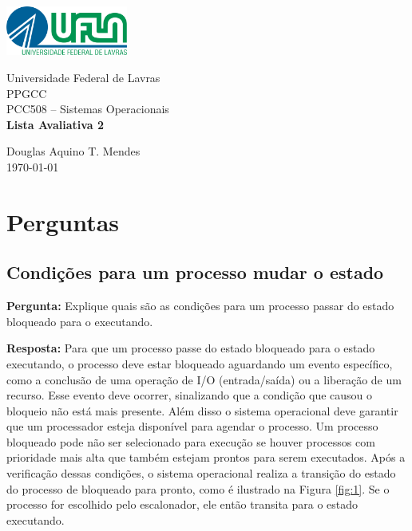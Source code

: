 \documentclass{article}
\begin{document}
\begin{titlepage}
    \centering
    \includegraphics[width=0.3\textwidth]{../Topic1/Avaliativo/Imagens/Logo UFLA - Colorida chapada.png}

    \vspace*{2cm} %
    \Large
    Universidade Federal de Lavras\\
    PPGCC\\
    PCC508 – Sistemas Operacionais\\
    
    \vspace{2cm} %
    \huge %
    \textbf{Lista Avaliativa 2}
    
    \vfill %
    
    \large
    Douglas Aquino T. Mendes\\
    \today %
\end{titlepage}

\tableofcontents
\newpage

\section{Perguntas}
\subsection{Condições para um processo mudar o estado}
\textbf{Pergunta:} Explique quais são as condições para um processo passar do estado bloqueado para o executando.\newline

\textbf{Resposta:} Para que um processo passe do estado bloqueado para o estado executando, o processo deve estar bloqueado aguardando um evento específico, como a conclusão de uma operação de I/O (entrada/saída) ou a liberação de um recurso. Esse evento deve ocorrer, sinalizando que a condição que causou o bloqueio não está mais presente. Além disso o sistema operacional deve garantir que um processador esteja disponível para agendar o processo. Um processo bloqueado pode não ser selecionado para execução se houver processos com prioridade mais alta que também estejam prontos para serem executados. Após a verificação dessas condições, o sistema operacional realiza a transição do estado do processo de bloqueado para pronto, como é ilustrado na Figura \ref{fig:1}. Se o processo for escolhido pelo escalonador, ele então transita para o estado executando. \cite{borges2024} \cite{tanenbaum2021}
\end{document}

